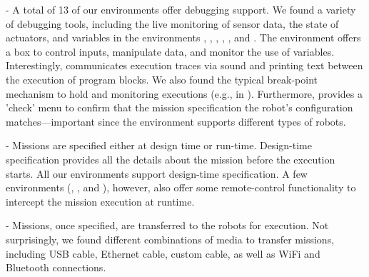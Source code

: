 \parhead{\fdebugging} - A total of 13 of our environments offer debugging support. We found a variety of debugging tools, including the live monitoring of sensor data, the state of actuators, and variables in the environments \picaxe, \aseba, \trik, \flyaq, \easyc, and \edison. The environment \edison offers a box to control inputs, manipulate data, and monitor the use of variables. %
Interestingly, \makecode communicates execution traces via sound and printing text between the execution of program blocks. %
We also found the typical break-point mechanism to hold and monitoring executions (e.g., in \robotmesh).
Furthermore, \openroberta provides a 'check' menu to confirm that the mission specification the robot's configuration matches---important since the environment supports different types of robots. 

\parhead{\fspectime} - Missions are specified either at design time or run-time. Design-time specification provides all the details about the mission before the execution starts.
All our environments support design-time specification. A few environments (\turtlebot, \sphero, and \choregraphe), however, also offer some remote-control functionality to intercept the mission execution at runtime. %

\parhead{\fdeployment} - Missions, once specified, are transferred to the robots for execution. Not surprisingly, we found different combinations of media to transfer missions, including USB cable, Ethernet cable, custom cable, as well as WiFi and Bluetooth connections.


